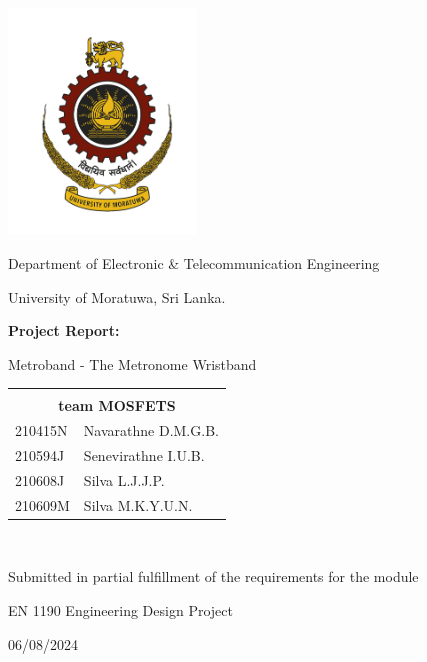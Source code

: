 \documentclass{article}
\begin{document}
	
	\begin{titlepage}
		
		\centering
		\vspace*{0.5cm}
		\includegraphics[width=5cm]{logo.png} %
		\par\vspace{0.02cm}
		Department of Electronic \& Telecommunication Engineering
  
            University of Moratuwa, Sri Lanka.
		\par\vspace{4cm}
		{\LARGE\bfseries Project Report:}\\{\LARGE Metroband - The Metronome Wristband\par}
		\vspace{4cm}
		\begin{tabular}{l l}
			& \\
            \multicolumn{2}{c}{\textbf{team MOSFETS}}\\
            210415N	&	Navarathne D.M.G.B.\\
            210594J &	Senevirathne I.U.B.\\
            210608J &	Silva L.J.J.P.\\
            210609M	&	Silva M.K.Y.U.N. \\
		\end{tabular}\\
		\vspace{1.3cm}
            {Submitted in partial fulfillment of the requirements for the module\par}
		{EN 1190 Engineering Design Project\par}
	
		\vspace{0.5cm}
		{\large 06/08/2024\par}
		\vfill
	\end{titlepage}
\end{document}
